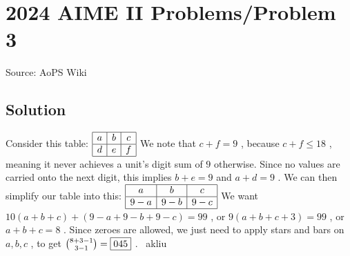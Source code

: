 \documentclass[12pt]{article}
\begin{document}
\section*{{2024 AIME II Problems/Problem 3}}
Source: AoPS Wiki

\subsection*{Solution}
Consider this table: $\begin{array}{|c|c|c|} \hline a & b & c \\ \hline d & e & f\\ \hline \end{array}$ We note that $c+f = 9$ , because $c+f \leq 18$ , meaning it never achieves a unit's digit sum of $9$ otherwise. Since no values are carried onto the next digit, this implies $b+e=9$ and $a+d=9$ . We can then simplify our table into this: $\begin{array}{|c|c|c|} \hline a & b & c \\ \hline 9-a & 9-b & 9-c \\ \hline \end{array}$ We want $10(a+b+c) + (9-a+9-b+9-c) = 99$ , or $9(a+b+c+3) = 99$ , or $a+b+c=8$ . Since zeroes are allowed, we just need to apply stars and bars on $a, b, c$ , to get $\tbinom{8+3-1}{3-1} = \boxed{045}$ . ~akliu
\end{document}

